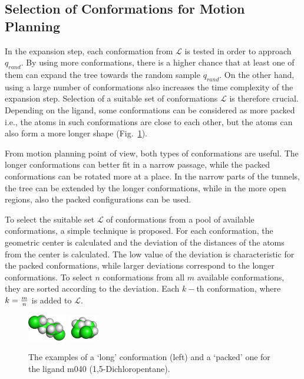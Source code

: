 \documentclass[usletter, 10pt, conference]{ieeeconf} %
\def\qrand{q_{rand}}
\def\L{\mathcal{L}}
\begin{document}
\subsection{Selection of Conformations for Motion Planning}
\label{sec::strat}

In the expansion step, each conformation from $\L$ is tested in order to approach $\qrand$.
By using more conformations, there is a higher chance that at least one of them can expand the tree towards the random sample $\qrand$.
On the other hand, using a large number of conformations also increases the time complexity of the expansion step.
Selection of a suitable set of conformations $\L$ is therefore crucial.
Depending on the ligand, some conformations can be considered as more packed i.e., the atoms in such conformations are close to each other, but 
the atoms can also form a more longer shape (Fig.~\ref{fig::m040c}).

From motion planning point of view, both types of conformations are useful.
The longer conformations can better fit in a narrow passage, while the packed conformations can be rotated more at a place.
In the narrow parts of the tunnels, the tree can be extended by the longer conformations, while in the more open regions, also the
packed configurations can be used.

To select the suitable set $\L$ of conformations from a pool of available conformations, a simple technique is proposed.  
For each conformation, the geometric center is calculated and the deviation of the distances of the atoms from the center is calculated.
The low value of the deviation is characteristic for the packed conformations, while larger deviations correspond to the longer conformations.
To select $n$ conformations from all $m$ available conformations, they are sorted according to the deviation.
Each $k-$th conformation, where $k={m\over n}$ is added to $\L$.

\begin{figure}
\centering
\includegraphics[width=0.15\textwidth]{fig/m040-conf1} \hskip 25pt
\includegraphics[width=0.12\textwidth]{fig/m040-conf2}
\caption{\label{fig::m040c}
 The examples of a `long' conformation (left) and a `packed' one for the ligand m040 (1,5-Dichloropentane).
}
\end{figure}
\end{document}

